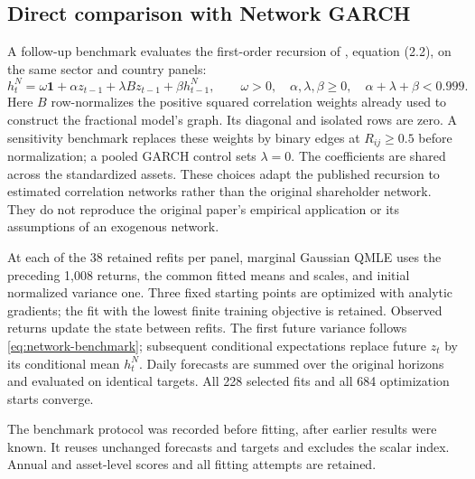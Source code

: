 \documentclass[12pt,a4paper]{article}
\newcommand{\one}{\mathbf 1}
\begin{document}
\subsection{Direct comparison with Network GARCH}
\label{sec:network}
A follow-up benchmark evaluates the first-order recursion of
\citet{zhou2020}, equation (2.2), on the same sector and country panels:
\begin{equation}
h^{N}_t=\omega\one+\alpha z_{t-1}+\lambda Bz_{t-1}+\beta h^{N}_{t-1},
\qquad \omega>0,\quad \alpha,\lambda,\beta\ge0,\quad
\alpha+\lambda+\beta<0.999.
\label{eq:network-benchmark}
\end{equation}
Here $B$ row-normalizes the positive squared correlation weights already used
to construct the fractional model's graph. Its diagonal and isolated rows are
zero. A sensitivity benchmark replaces these weights by binary edges at
$R_{ij}\ge0.5$ before normalization; a pooled GARCH control sets $\lambda=0$.
The coefficients are shared across the standardized assets. These choices
adapt the published recursion to estimated correlation networks rather than
the original shareholder network. They do not reproduce the original paper's
empirical application or its assumptions of an exogenous network.

At each of the 38 retained refits per panel, marginal Gaussian QMLE uses the
preceding 1,008 returns, the common fitted means and scales, and initial
normalized variance one. Three fixed starting points are optimized with
analytic gradients; the fit with the lowest finite training objective is
retained. Observed returns update the state between refits. The first future
variance follows \eqref{eq:network-benchmark}; subsequent conditional
expectations replace future $z_t$ by its conditional mean $h^N_t$. Daily
forecasts are summed over the original horizons and evaluated on identical
targets. All 228 selected fits and all 684 optimization starts converge.

The benchmark protocol was recorded before fitting, after earlier results
were known. It reuses unchanged forecasts and targets and excludes the scalar
index. Annual and asset-level scores and all fitting attempts are retained.

\begin{table}[htbp]
\centering\small
\setlength{\tabcolsep}{4pt}

\caption{Mean normalized QLIKE for the separately recorded network comparison.
The columns retain the same 1-, 5- and 21-session targets. Network GARCH uses
shared coefficients; the pooled control removes its network term. Lower is better;
bold marks the minimum in each column.}
\label{tab:network}
\end{table}
\end{document}

